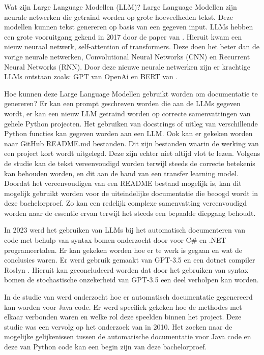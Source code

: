 Wat zijn Large Language Modellen (LLM)?
Large Language Modellen zijn neurale netwerken die getraind worden op grote hoeveelheden tekst. 
Deze modellen kunnen tekst genereren op basis van een gegeven input. 
LLMs hebben een grote vooruitgang gekend in 2017 door de paper van \textcite{VaswaniEtAl2017}. 
Hieruit kwam een nieuw neuraal netwerk, self-attention of transformers. 
Deze doen het beter dan de vorige neurale netwerken, Convolutional Neural Networks (CNN) en Recurrent Neural Networks (RNN).
Door deze nieuwe neurale netwerken zijn er krachtige LLMs ontstaan zoals: GPT van OpenAi  \autocite{RandfordEtAL2018} en BERT van \textcite{DevlinEtAl2019}.

Hoe kunnen deze Large Language Modellen gebruikt worden om documentatie te genereren?
Er kan een prompt geschreven worden die aan de LLMs gegeven wordt, er kan een nieuw LLM getraind worden op correcte samenvattingen van gehele Python projecten.
Het gebruiken van docstrings of uitleg van verschillende Python functies kan gegeven worden aan een LLM. 
Ook kan er gekeken worden naar GitHub README.md bestanden. Dit zijn bestanden waarin de werking van een project kort wordt uitgelegd. Deze zijn echter niet altijd vlot te lezen. 
Volgens de studie \textcite{GaoEtAl2023} kan de tekst vereenvoudigd worden terwijl steeds de correcte betekenis kan behouden worden, en dit aan de hand van een transfer learning model.
Doordat het vereenvoudigen van een README bestand mogelijk is, kan dit mogelijk gebruikt worden voor de uiteindelijke documentatie die beoogd wordt in deze bachelorproef. 
Zo kan een redelijk complexe samenvatting vereenvoudigd worden naar de essentie ervan terwijl het steeds een bepaalde diepgang behoudt. 

In 2023 werd het gebruiken van LLMs bij het automatisch documenteren van code met behulp van syntax bomen onderzocht door \textcite{Procko2023} voor C\# en .NET programeertalen.
Er kan gekeken worden hoe er te werk is gegaan en wat de conclusies waren. Er werd gebruik gemaakt van GPT-3.5 en een dotnet compiler Roslyn \autocite{Roslyn}. 
Hieruit kan geconcludeerd worden dat door het gebruiken van syntax bomen de stochastische onzekerheid van GPT-3.5 een deel verholpen kan worden. 

In de studie van \textcite{McBurneyMcMillan2014} werd onderzocht hoe er automatisch documentatie gegenereerd kan worden voor Java code. 
Er werd specifiek gekeken hoe de methodes met elkaar verbonden waren en welke rol deze speelden binnen het project.
Deze studie was een vervolg op het onderzoek van \textcite{SridharaEtAL2010} in 2010.
Het zoeken naar de mogelijke gelijkenissen tussen de automatische documentatie voor Java code en deze van Python code kan een begin zijn van deze bachelorproef. 

